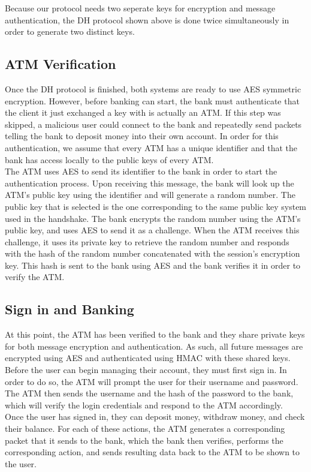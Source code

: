 		Because our protocol needs two seperate keys for encryption and message authentication, the DH protocol shown above is done twice simultaneously in order to generate two distinct keys.

	\subsection{ATM Verification}\label{sec:networking-atm}
		Once the DH protocol is finished, both systems are ready to use AES symmetric encryption. However, before banking can start, the bank must authenticate that the client it just exchanged
		a key with is actually an ATM. If this step was skipped, a malicious user could connect to the bank and repeatedly send packets telling the bank to deposit money into their own account.
		In order for this authentication, we assume that every ATM has a unique identifier and that the bank has access locally to the public keys of every ATM.\\

		The ATM uses AES to send its identifier to the bank in order to start the authentication process. Upon receiving this message, the bank will look up the ATM's public key using the
		identifier and will generate a random number. The public key that is selected is the one corresponding to the same public key system used in the handshake. The bank encrypts the random
		number using the ATM's public key, and uses AES to send it as a challenge. When the ATM receives this challenge, it uses its private key to retrieve the random number and responds with
		the hash of the random number concatenated with the session's encryption key. This hash is sent to the bank using AES and the bank verifies it in order to verify the ATM.

	\subsection{Sign in and Banking}\label{sec:networking-signin}
		At this point, the ATM has been verified to the bank and they share private keys for both message encryption and authentication. As such, all future messages are encrypted using AES and
		authenticated using HMAC with these shared keys.\\

		Before the user can begin managing their account, they must first sign in. In order to do so, the ATM will prompt the user for their username and password. The ATM then sends the username
		and the hash of the password to the bank, which will verify the login credentials and respond to the ATM accordingly.\\

		Once the user has signed in, they can deposit money, withdraw money, and check their balance. For each of these actions, the ATM generates a corresponding packet that it sends to the bank,
		which the bank then verifies, performs the corresponding action, and sends resulting data back to the ATM to be shown to the user.
